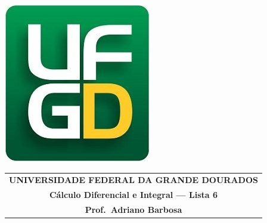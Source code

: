 \documentclass[a4paper,5pt]{amsbook}
\begin{document}
\thispagestyle{empty}
\pagestyle{empty}
\begin{minipage}[h]{0.14\textwidth}
	\includegraphics[scale=0.24]{../../ufgd.png}
\end{minipage}
\begin{minipage}[h]{\textwidth}
\begin{tabular}{c}
{{\bf UNIVERSIDADE FEDERAL DA GRANDE DOURADOS}}\\
{{\bf C\'alculo Diferencial e Integral --- Lista 6}}\\
{{\bf Prof.\ Adriano Barbosa}}\\
\end{tabular}
\vspace{-0.45cm}
%
\end{minipage}

\end{document}
